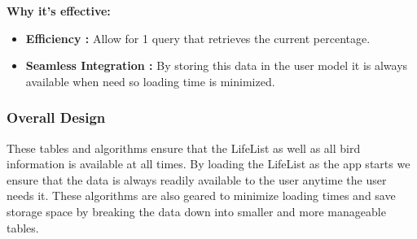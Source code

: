 \documentclass[a4paper]{article}
\begin{document}
\textbf{Why it's effective:}
\begin{itemize}
    \item \textbf{Efficiency :} Allow for 1 query that retrieves the current percentage.
    \item  \textbf{Seamless Integration :} By storing this data in the user model it is always available when need so loading time is minimized.
\end{itemize}

\subsubsection{Overall Design}
These tables and algorithms ensure that the LifeList as well as all bird information is available at all times. By loading the LifeList as the app starts we ensure that the data is always readily available to the user anytime the user needs it. These algorithms are also geared to minimize loading times and save storage space by breaking the data down into smaller and more manageable tables. 
\end{document}
